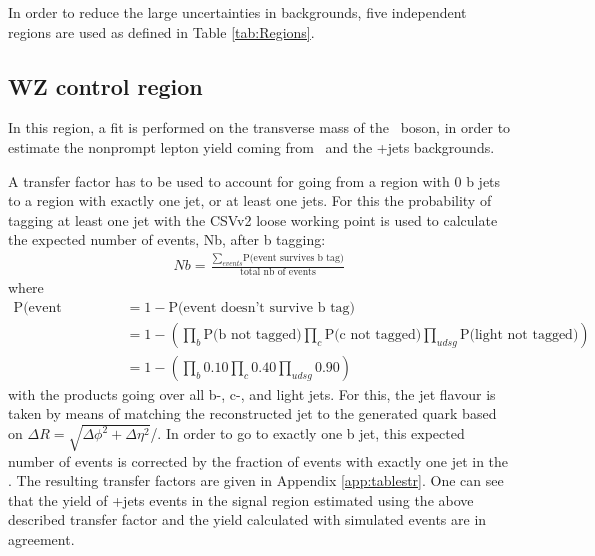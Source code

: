 In order to reduce the large uncertainties in backgrounds, five independent regions are used as defined in Table  \ref{tab:Regions}. 


\subsection{WZ control region}
In this region, a fit is performed on the transverse mass of the \PW\ boson, in order to estimate the nonprompt  lepton yield coming from \DY\ and the \WZ+jets backgrounds. 

A transfer factor has to be used to account for going from a region with 0 b jets to a region with exactly one jet, or at least one jets. For this the probability of tagging at least one jet with the CSVv2 loose working point is used to calculate the expected number of events, Nb, after b tagging: 
\begin{align}
	Nb = \frac{\sum_{events}\text{P(event survives b tag)}}{\text{total nb of events}}
\end{align}
where 
\begin{align}
	\text{P(event survives b tag )} &= 1 - \text{P(event doesn't survive b tag)}\\
	& = 1 - \left(\prod_{b} \text{P(b not tagged)} \prod_{c} \text{P(c not tagged)} \prod_{udsg} \text{P(light not tagged)}\right)\\
	& = 1 - \left(\prod_{b} 0.10 \prod_{c} 0.40 \prod_{udsg} 0.90\right)
\end{align}
with the products going over all b-, c-, and light jets. For this, the jet flavour is taken by means of matching the reconstructed jet to the generated quark based on $\Delta R = \sqrt{\Delta \phi^2 + \Delta \eta^2}$/.  
In order to go to exactly one b jet, this expected number of events is corrected by the fraction of events with exactly  one jet in the \WZCR. The resulting transfer factors are given in Appendix \ref{app:tablestr}. One can see  that the yield of \WZ+jets events in the signal region estimated using the above described transfer factor and the yield calculated with simulated events are in agreement. 

